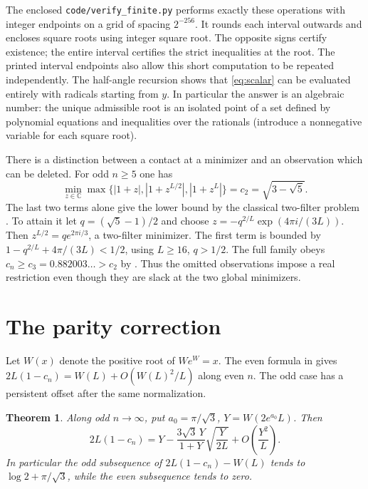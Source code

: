 \documentclass[11pt,letterpaper]{article}
\newtheorem{theorem}{Theorem}
\newcommand{\C}{\mathbb C}
\newcommand{\head}[1]{\par\medskip{\large\bfseries\color{ink}#1}\par\smallskip}
\begin{document}
The enclosed \texttt{code/verify\_finite.py} performs exactly these operations
with integer endpoints on a grid of spacing \(2^{-256}\). It rounds each
interval outwards and encloses square roots using integer square root.
The opposite signs certify existence; the entire interval certifies the
strict inequalities at the root. The printed interval endpoints also
allow this short computation to be repeated independently.
The half-angle recursion shows that \eqref{eq:scalar} can be evaluated
entirely with radicals starting from \(y\). In particular the answer is an
algebraic number: the unique admissible root is an isolated point of a set
defined by polynomial equations and inequalities over the rationals (introduce
a nonnegative variable for each square root).

\head{Keeping only the three active shifts}
There is a distinction between a contact at a minimizer and an observation
which can be deleted. For odd \(n\ge5\) one has
\[
 \min_{z\in\C}\max\{|1+z|,|1+z^{L/2}|,|1+z^L|\}=c_2=\sqrt{3-\sqrt5}.
\]
The last two terms alone give the lower bound by the classical two-filter
problem \cite{contest}. To attain it let \(q=(\sqrt5-1)/2\) and choose
\(z=-q^{2/L}\exp(4\pi i/(3L))\). Then \(z^{L/2}=q e^{2\pi i/3}\),
a two-filter minimizer. The first term is bounded by
\(1-q^{2/L}+4\pi/(3L)<1/2\), using \(L\ge16\), \(q>1/2\).
The full family obeys \(c_n\ge c_3=0.882003\ldots>c_2\) by
\cite{packet}. Thus the omitted observations impose a real restriction
even though they are slack at the two global minimizers.

\newpage
\section{The parity correction}
Let \(W(x)\) denote the positive root of \(W e^W=x\). The even formula in
\cite{packet} gives \(2L(1-c_n)=W(L)+O(W(L)^2/L)\) along even \(n\).
The odd case has a persistent offset after the same normalization.

\begin{theorem}\label{th:asymptotic}
Along odd \(n\to\infty\), put \(a_0=\pi/\sqrt3\), \(Y=W(2e^{a_0}L)\).
Then
\begin{equation}\label{eq:expansion}
 2L(1-c_n)
 =Y-\frac{3\sqrt3\,Y}{1+Y}\sqrt{\frac{Y}{2L}}
       +O\!\left(\frac{Y^2}{L}\right).
\end{equation}
In particular the odd subsequence of \(2L(1-c_n)-W(L)\) tends to
\(\log 2+\pi/\sqrt3\), while the even subsequence tends to zero.
\end{theorem}
\end{document}
